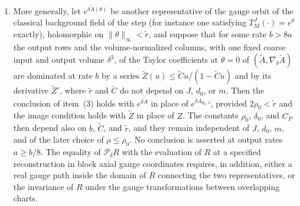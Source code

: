 \begin{theorem}
\begin{enumerate}
\[
 \mathcal B_{\rho,a}(\mathcal P_\delta R)
 \le C_a[\delta+\delta^{-1}w_{m/\delta}]
                        \mathcal B_{\rho,a}(R)
 \le C_P(a)\delta\,\mathcal B_{\rho,a}(R).
\]
The radius $\rho$ and the rate $a$ are the same on both sides; in the norm of $R$ distances are measured in units of the fine lattice, and in the norm of $\mathcal P_\delta R$ in units of the coarse lattice. The constant $C_P(a)$ includes the bound on the finite-period remainder, uniformly for $m\ge4$.
\item More generally, let $e^{\delta\widetilde A(\theta)}$ be another representative of the gauge orbit of the classical background field of the step (for instance one satisfying $T_M^J(\cdot)=e^\theta$ exactly), holomorphic on $\|\theta\|_\infty<\widetilde r$, and suppose that for some rate $b>8a$ the output rows and the volume-normalized columns, with one fixed coarse input and output volume $\delta^3$, of the Taylor coefficients at $\theta=0$ of $(\widetilde A,\nabla_\delta\widetilde A)$ are dominated at rate $b$ by a series $\widetilde Z(u)\le\widetilde Cu/(1-\widetilde Cu)$ and by its derivative $\widetilde Z'$, where $\widetilde r$ and $\widetilde C$ do not depend on $J$, $d_0$, or $m$. Then the conclusion of item~(3) holds with $e^{\delta\widetilde A}$ in place of $e^{\delta A_{d_0,J}}$, provided $2\rho_0<\widetilde r$ and the image condition holds with $\widetilde Z$ in place of $Z$. The constants $\rho_0$, $\delta_0$, and $C_P$ then depend also on $b$, $\widetilde C$, and $\widetilde r$, and they remain independent of $J$, $d_0$, $m$, and of the later choice of $\rho\le\rho_0$. No conclusion is asserted at output rates $a\ge b/8$. The equality of $\mathcal P_\delta R$ with the evaluation of $R$ at a specified reconstruction in block axial gauge coordinates requires, in addition, either a real gauge path inside the domain of $R$ connecting the two representatives, or the invariance of $R$ under the gauge transformations between overlapping charts.
\end{enumerate}
\end{theorem}

